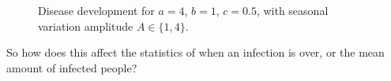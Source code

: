 \begin{figure}
    \centering
    \caption{Disease development for $a=4$, $b=1$, $c=0.5$, with seasonal variation amplitude $A \in \{1,4\}$.}
    \label{fig:seasonalb1}
\end{figure}

So how does this affect the statistics of when an infection is over, or the mean amount of infected people?


